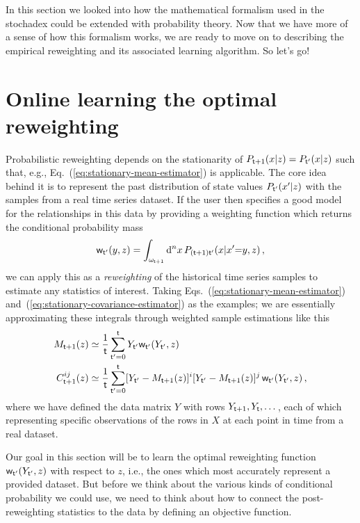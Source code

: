 In this section we looked into how the mathematical formalism used in the stochadex could be extended with probability theory. Now that we have more of a sense of how this formalism works, we are ready to move on to describing the empirical reweighting and its associated learning algorithm. So let's go!

\section{\sffamily Online learning the optimal reweighting}

Probabilistic reweighting depends on the stationarity of $P_{{\sf t}+1}(x\vert z)=P_{{\sf t}'}(x\vert z)$ such that, e.g., Eq.~(\ref{eq:stationary-mean-estimator}) is applicable. The core idea behind it is to represent the past distribution of state values $P_{{\sf t}'}(x'\vert z)$ with the samples from a real time series dataset. If the user then specifies a good model for the relationships in this data by providing a weighting function which returns the conditional probability mass
\begin{align}
{\sf w}_{{\sf t}'}(y,z) = \int_{\omega_{{\sf t}+1}} {\rm d}^nx \, P_{({\sf t}+1){\sf t}'}(x\vert x'{=}y,z) \,,  
\end{align}
we can apply this as a \emph{reweighting} of the historical time series samples to estimate any statistics of interest. Taking Eqs.~(\ref{eq:stationary-mean-estimator}) and~(\ref{eq:stationary-covariance-estimator}) as the examples; we are essentially approximating these integrals through weighted sample estimations like this
\begin{align}
M_{{\sf t}+1}(z) &\simeq \frac{1}{{\sf t}}\sum^{{\sf t}}_{{\sf t}'=0}Y_{{\sf t}'} {\sf w}_{{\sf t}'}(Y_{{\sf t}'},z) \label{eq:mean-reweighting} \\
C^{ij}_{{\sf t}+1}(z) &\simeq \frac{1}{{\sf t}}\sum^{{\sf t}}_{{\sf t}'=0}[Y_{{\sf t}'}-M_{{\sf t}+1}(z)]^i[Y_{{\sf t}'}-M_{{\sf t}+1}(z)]^j \, {\sf w}_{{\sf t}'}(Y_{{\sf t}'},z) \label{eq:covariance-reweighting} \,,
\end{align}
where we have defined the data matrix $Y$ with rows $Y_{{\sf t}+1}, Y_{{\sf t}}, \dots$, each of which representing specific observations of the rows in $X$ at each point in time from a real dataset.

Our goal in this section will be to learn the optimal reweighting function ${\sf w}_{{\sf t}'}(Y_{{\sf t}'},z)$ with respect to $z$, i.e., the ones which most accurately represent a provided dataset. But before we think about the various kinds of conditional probability we could use, we need to think about how to connect the post-reweighting statistics to the data by defining an objective function. 


